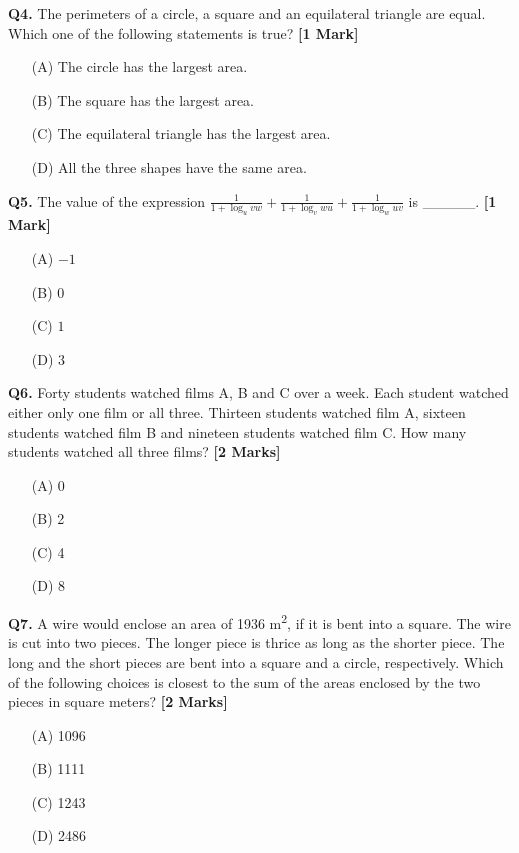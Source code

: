 \documentclass[11pt]{article}
\newcommand{\questiona}[2]{
    \noindent\textbf{Q#2.} #1 \hfill \textbf{[1 Mark]}
}
\newcommand{\questionb}[2]{
    \noindent\textbf{Q#2.} #1 \hfill \textbf{[2 Marks]}
}
\begin{document}
\vspace{0.5cm}

\questiona{The perimeters of a circle, a square and an equilateral triangle are equal. Which one of the following statements is true?}{4}
\begin{enumerate}
    \item[(A)] The circle has the largest area.  
    \item[(B)] The square has the largest area.  
    \item[(C)] The equilateral triangle has the largest area.  
    \item[(D)] All the three shapes have the same area.  
\end{enumerate}

\vspace{0.5cm}

\questiona{The value of the expression $\frac{1}{1+\log_u vw} + \frac{1}{1+\log_v wu} + \frac{1}{1+\log_w uv}$ is \_\_\_\_\_.}{5}
\begin{enumerate}
    \item[(A)] $-1$  
    \item[(B)] $0$  
    \item[(C)] $1$  
    \item[(D)] $3$  
\end{enumerate}

\vspace{0.5cm}

\questionb{Forty students watched films A, B and C over a week. Each student watched either only one film or all three. Thirteen students watched film A, sixteen students watched film B and nineteen students watched film C. How many students watched all three films?}{6}
\begin{enumerate}
    \item[(A)] 0  
    \item[(B)] 2  
    \item[(C)] 4  
    \item[(D)] 8  
\end{enumerate}

\vspace{0.5cm}

\questionb{A wire would enclose an area of 1936 m\textsuperscript{2}, if it is bent into a square. The wire is cut into two pieces. The longer piece is thrice as long as the shorter piece. The long and the short pieces are bent into a square and a circle, respectively. Which of the following choices is closest to the sum of the areas enclosed by the two pieces in square meters?}{7}
\begin{enumerate}
    \item[(A)] 1096  
    \item[(B)] 1111  
    \item[(C)] 1243  
    \item[(D)] 2486  
\end{enumerate}
\end{document}
